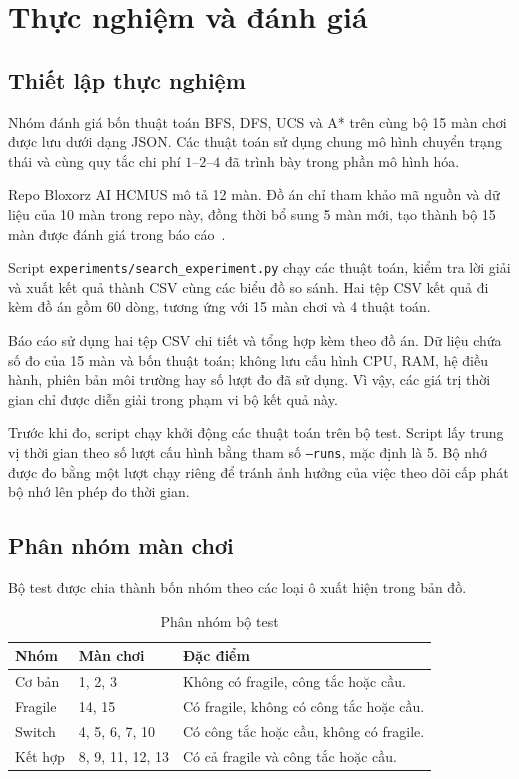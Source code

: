 \clearpage
\section{Thực nghiệm và đánh giá}

\subsection{Thiết lập thực nghiệm}

Nhóm đánh giá bốn thuật toán BFS, DFS, UCS và A* trên cùng
bộ 15 màn chơi được lưu dưới dạng JSON. Các thuật toán sử dụng
chung mô hình chuyển trạng thái và cùng quy tắc chi phí
$1$--$2$--$4$ đã trình bày trong phần mô hình hóa.

Repo Bloxorz AI HCMUS mô tả 12 màn. Đồ án chỉ tham khảo mã nguồn
và dữ liệu của 10 màn trong repo này, đồng thời bổ sung 5 màn mới,
tạo thành bộ 15 màn được đánh giá trong báo cáo~\cite{reference-game}.

Script \texttt{experiments/search\_experiment.py} chạy các
thuật toán, kiểm tra lời giải và xuất kết quả thành CSV cùng
các biểu đồ so sánh. Hai tệp CSV kết quả đi kèm đồ án gồm 60 dòng,
tương ứng với 15 màn chơi và 4 thuật toán.

Báo cáo sử dụng hai tệp CSV chi tiết và tổng hợp kèm theo đồ án. Dữ liệu chứa số đo của 15 màn và bốn thuật toán; không lưu cấu hình CPU, RAM, hệ điều hành, phiên bản môi trường hay số lượt đo đã sử dụng. Vì vậy, các giá trị thời gian chỉ được diễn giải trong phạm vi bộ kết quả này.

Trước khi đo, script chạy khởi động các thuật toán trên bộ test.
Script lấy trung vị thời gian theo số lượt cấu hình bằng tham số \texttt{--runs}, mặc định là 5.
Bộ nhớ được đo bằng một lượt chạy riêng để tránh ảnh hưởng
của việc theo dõi cấp phát bộ nhớ lên phép đo thời gian.

\subsection{Phân nhóm màn chơi}

Bộ test được chia thành bốn nhóm theo các loại ô xuất hiện
trong bản đồ.

\begin{table}[htbp]
\centering
\small
\caption{Phân nhóm bộ test}
\begin{tabularx}{\linewidth}{|l|p{3.6cm}|X|}
\hline
Nhóm & Màn chơi & Đặc điểm \\\hline
Cơ bản
& 1, 2, 3
& Không có fragile, công tắc hoặc cầu. \\\hline
Fragile
& 14, 15
& Có fragile, không có công tắc hoặc cầu. \\\hline
Switch
& 4, 5, 6, 7, 10
& Có công tắc hoặc cầu, không có fragile. \\\hline
Kết hợp
& 8, 9, 11, 12, 13
& Có cả fragile và công tắc hoặc cầu. \\\hline
\end{tabularx}
\end{table}

